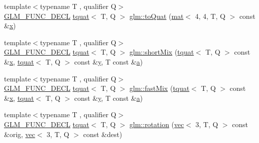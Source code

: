 \begin{DoxyCompactItemize}
\item 
{\footnotesize template$<$typename T , qualifier Q$>$ }\\\mbox{\hyperlink{setup_8hpp_ab2d052de21a70539923e9bcbf6e83a51}{G\+L\+M\+\_\+\+F\+U\+N\+C\+\_\+\+D\+E\+CL}} \mbox{\hyperlink{structglm_1_1tquat}{tquat}}$<$ T, Q $>$ \mbox{\hyperlink{group__gtx__quaternion_ga6c0a178ac9c7d23e1a6848045d83aa54}{glm\+::to\+Quat}} (\mbox{\hyperlink{structglm_1_1mat}{mat}}$<$ 4, 4, T, Q $>$ const \&\mbox{\hyperlink{_s_d_l__opengl_8h_ad0e63d0edcdbd3d79554076bf309fd47}{x}})
\item 
{\footnotesize template$<$typename T , qualifier Q$>$ }\\\mbox{\hyperlink{setup_8hpp_ab2d052de21a70539923e9bcbf6e83a51}{G\+L\+M\+\_\+\+F\+U\+N\+C\+\_\+\+D\+E\+CL}} \mbox{\hyperlink{structglm_1_1tquat}{tquat}}$<$ T, Q $>$ \mbox{\hyperlink{group__gtx__quaternion_gaf0ad63ac791b1f9a587e363837c2d538}{glm\+::short\+Mix}} (\mbox{\hyperlink{structglm_1_1tquat}{tquat}}$<$ T, Q $>$ const \&\mbox{\hyperlink{_s_d_l__opengl_8h_ad0e63d0edcdbd3d79554076bf309fd47}{x}}, \mbox{\hyperlink{structglm_1_1tquat}{tquat}}$<$ T, Q $>$ const \&\mbox{\hyperlink{_s_d_l__opengl_8h_a1675d9d7bb68e1657ff028643b4037e3}{y}}, T const \&\mbox{\hyperlink{_s_d_l__opengl__glext_8h_a3309789fc188587d666cda5ece79cf82}{a}})
\item 
{\footnotesize template$<$typename T , qualifier Q$>$ }\\\mbox{\hyperlink{setup_8hpp_ab2d052de21a70539923e9bcbf6e83a51}{G\+L\+M\+\_\+\+F\+U\+N\+C\+\_\+\+D\+E\+CL}} \mbox{\hyperlink{structglm_1_1tquat}{tquat}}$<$ T, Q $>$ \mbox{\hyperlink{group__gtx__quaternion_gac5c77bc74dfc750aaf271d68f271bf2b}{glm\+::fast\+Mix}} (\mbox{\hyperlink{structglm_1_1tquat}{tquat}}$<$ T, Q $>$ const \&\mbox{\hyperlink{_s_d_l__opengl_8h_ad0e63d0edcdbd3d79554076bf309fd47}{x}}, \mbox{\hyperlink{structglm_1_1tquat}{tquat}}$<$ T, Q $>$ const \&\mbox{\hyperlink{_s_d_l__opengl_8h_a1675d9d7bb68e1657ff028643b4037e3}{y}}, T const \&\mbox{\hyperlink{_s_d_l__opengl__glext_8h_a3309789fc188587d666cda5ece79cf82}{a}})
\item 
{\footnotesize template$<$typename T , qualifier Q$>$ }\\\mbox{\hyperlink{setup_8hpp_ab2d052de21a70539923e9bcbf6e83a51}{G\+L\+M\+\_\+\+F\+U\+N\+C\+\_\+\+D\+E\+CL}} \mbox{\hyperlink{structglm_1_1tquat}{tquat}}$<$ T, Q $>$ \mbox{\hyperlink{group__gtx__quaternion_ga5a729f33cbd904c9ca14cdf25d0a07e4}{glm\+::rotation}} (\mbox{\hyperlink{structglm_1_1vec}{vec}}$<$ 3, T, Q $>$ const \&orig, \mbox{\hyperlink{structglm_1_1vec}{vec}}$<$ 3, T, Q $>$ const \&dest)

\end{DoxyCompactItemize}
